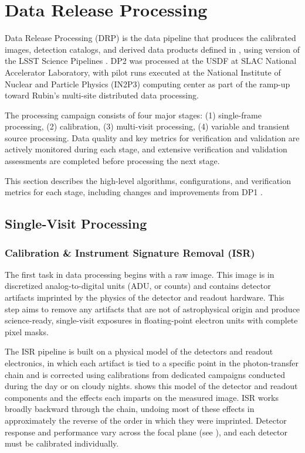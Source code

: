 \section{Data Release Processing}
\label{sec:drp}

Data Release Processing (DRP) is the data pipeline that produces the calibrated images, detection catalogs, and derived data products defined in , using version \sciencepipelinesversion of the LSST Science Pipelines \citep[][]{PSTN-019}.
\gls{DP2} was processed at the \gls{USDF} at \gls{SLAC} National Accelerator Laboratory, with pilot runs executed at the National Institute of Nuclear and Particle Physics (IN2P3) computing center as part of the ramp-up toward Rubin's multi-site distributed data processing.

The processing campaign consists of four major stages: (1) single-frame processing, (2) \gls{calibration}, (3) multi-visit processing, (4) variable and \gls{transient} source processing.
Data quality and key metrics for verification and validation are actively monitored during each stage, and extensive verification and validation assessments are completed before processing the next stage.

This section describes the high-level algorithms, configurations, and verification metrics for each stage, including changes and improvements from DP1 \citep[][]{2026AJ....171..360V}.

\subsection{Single-Visit Processing} \label{sec:drp-singlevisit}

\subsubsection{Calibration \& Instrument Signature Removal (ISR)} \label{sec:drp-singlevisit-calibrationisr}

The first task in data processing begins with a raw image.
This image is in discretized analog-to-digital units (\gls{ADU}, or counts) and contains detector artifacts imprinted by the physics of the detector and readout hardware.
This step aims to remove any artifacts that are not of astrophysical origin and produce science-ready, single-visit exposures in floating-point electron units with complete pixel masks.

The \gls{ISR} \gls{pipeline} is built on a physical model of the detectors and readout electronics, in which each artifact is tied to a specific point in the photon-transfer chain and is corrected using calibrations from dedicated campaigns conducted during the day or on cloudy nights.  shows this model of the detector and readout components and the effects each imparts on the measured image.
\gls{ISR} works broadly backward through the chain, undoing most of these effects in approximately the reverse of the order in which they were imprinted.
Detector response and performance vary across the focal plane (see ), and each detector must be calibrated individually.

